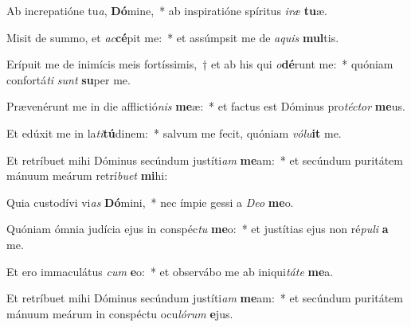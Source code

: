 \item Ab increpatióne tu\textit{a}, \textbf{Dó}mine,~* ab inspiratióne spíritus \textit{i}\textit{ræ} \textbf{tu}æ.
\item Misit de summo, et \textit{ac}\textbf{cé}pit me:~* et assúmpsit me de \textit{a}\textit{quis} \textbf{mul}tis.
\item Erípuit me de inimícis meis fortíssimis,~† et ab his qui \textit{o}\textbf{dé}runt me:~* quóniam confortá\textit{ti} \textit{sunt} \textbf{su}per me.
\item Prævenérunt me in die afflictió\textit{nis} \textbf{me}æ:~* et factus est Dóminus pro\textit{téc}\textit{tor} \textbf{me}us.
\item Et edúxit me in la\textit{ti}\textbf{tú}dinem:~* salvum me fecit, quóniam \textit{vó}\textit{lu}\textbf{it} me.
\item Et retríbuet mihi Dóminus secúndum justíti\textit{am} \textbf{me}am:~* et secúndum puritátem mánuum meárum retrí\textit{bu}\textit{et} \textbf{mi}hi:
\item Quia custodívi vi\textit{as} \textbf{Dó}mini,~* nec ímpie gessi a \textit{De}\textit{o} \textbf{me}o.
\item Quóniam ómnia judícia ejus in conspéc\textit{tu} \textbf{me}o:~* et justítias ejus non ré\textit{pu}\textit{li} \textbf{a} me.
\item Et ero immaculátus \textit{cum} \textbf{e}o:~* et observábo me ab iniqui\textit{tá}\textit{te} \textbf{me}a.
\item Et retríbuet mihi Dóminus secúndum justíti\textit{am} \textbf{me}am:~* et secúndum puritátem mánuum meárum in conspéctu ocu\textit{ló}\textit{rum} \textbf{e}jus.
